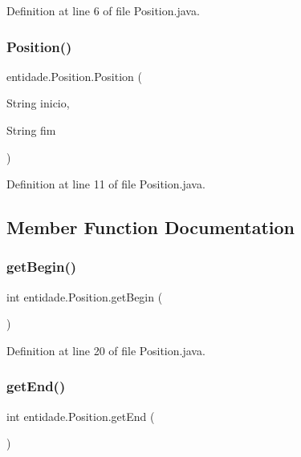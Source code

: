 Definition at line 6 of file Position.\+java.

\hypertarget{classentidade_1_1Position_a2105dcad51d3f4924d5f0770958c529e}{}\label{classentidade_1_1Position_a2105dcad51d3f4924d5f0770958c529e} 
\subsubsection{\texorpdfstring{Position()}{Position()}\hspace{0.1cm}{\footnotesize\ttfamily [2/2]}}
{\footnotesize\ttfamily entidade.\+Position.\+Position (\begin{DoxyParamCaption}\item[{String}]{inicio,  }\item[{String}]{fim }\end{DoxyParamCaption})}



Definition at line 11 of file Position.\+java.



\subsection{Member Function Documentation}
\hypertarget{classentidade_1_1Position_a1aa71cecbffd53debbe94973af2cca8c}{}\label{classentidade_1_1Position_a1aa71cecbffd53debbe94973af2cca8c} 
\subsubsection{\texorpdfstring{get\+Begin()}{getBegin()}}
{\footnotesize\ttfamily int entidade.\+Position.\+get\+Begin (\begin{DoxyParamCaption}{ }\end{DoxyParamCaption})}



Definition at line 20 of file Position.\+java.

\hypertarget{classentidade_1_1Position_aac6cfcd661388cf3faa47b6c80956e66}{}\label{classentidade_1_1Position_aac6cfcd661388cf3faa47b6c80956e66} 
\subsubsection{\texorpdfstring{get\+End()}{getEnd()}}
{\footnotesize\ttfamily int entidade.\+Position.\+get\+End (\begin{DoxyParamCaption}{ }\end{DoxyParamCaption})}



